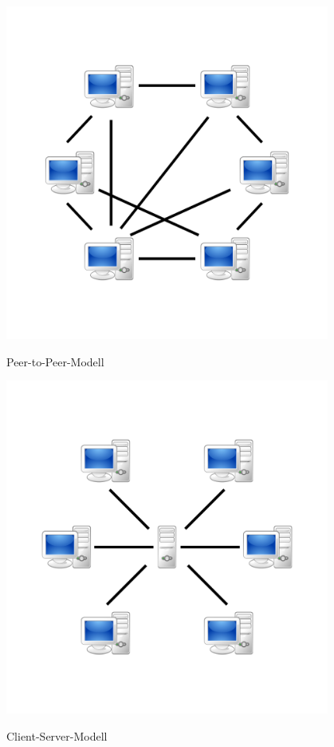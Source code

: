 \begin{minipage}{0.5\textwidth}
\begin{center}
\includegraphics[width=0.8\textwidth]{./inf/SEKII/42_Netzwerke/P2P.png}

Peer-to-Peer-Modell
\end{center}
\end{minipage}
\begin{minipage}{0.5\textwidth}
\begin{center}
\includegraphics[width=0.8\textwidth]{./inf/SEKII/42_Netzwerke/CS.png}

Client-Server-Modell
\end{center}
\end{minipage}


